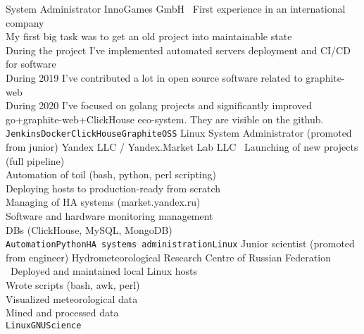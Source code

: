 \documentclass[11pt]{developercv} %
\begin{document}
\begin{entrylist}
    {System Administrator}
    {InnoGames GmbH}
    {\
      First experience in an international company\\
      My first big task was to get an old project into maintainable state\\
      During the project I've implemented automated servers deployment and CI/CD for software\\
      During 2019 I've contributed a lot in open source software related to graphite-web\\
      During 2020 I've focused on golang projects and significantly improved go+graphite-web+ClickHouse eco-system. They are visible on the github.\\
      \texttt{Jenkins}\slashsep\texttt{Docker}\slashsep\texttt{ClickHouse}\slashsep\texttt{Graphite}\slashsep\texttt{OSS}
    }
    {Linux System Administrator (promoted from junior)}
    {Yandex LLC / Yandex.Market Lab LLC}
    {\
      Launching of new projects (full pipeline)\\
      Automation of toil (bash, python, perl scripting)\\
      Deploying hosts to production-ready from scratch\\
      Managing of HA systems (market.yandex.ru)\\
      Software and hardware monitoring management\\
      DBs (ClickHouse, MySQL, MongoDB)\\
      \texttt{Automation}\slashsep\texttt{Python}\slashsep\texttt{HA systems administration}\slashsep\texttt{Linux}
    }
  \entry{2009 --- 2013}
    {Junior scientist (promoted from engineer)}
    {Hydrometeorological Research Centre of Russian Federation}
    {\
      Deployed and maintained local Linux hosts\\
      Wrote scripts (bash, awk, perl)\\
      Visualized meteorological data\\
      Mined and processed data\\
      \texttt{Linux}\slashsep\texttt{GNU}\slashsep\texttt{Science}
    }
\end{entrylist}

\end{document}
